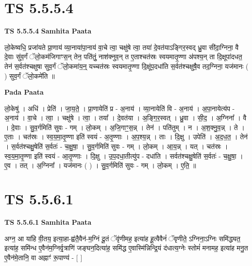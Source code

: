 \documentclass[17pt]{extarticle}
\begin{document}

\section{ TS 5.5.5.4 }

\textbf{TS 5.5.5.4 } \newline
\textbf{Samhita Paata} \newline

लो॒केष्वधि॒ प्रजा॑यते प्रा॒णाय॑ व्या॒नाया॑पा॒नाय॑ वा॒चे त्वा॒ चक्षु॑षे त्वा॒ तया॑ दे॒वत॑याऽङ्गिर॒स्वद् ध्रु॒वा सी॑दा॒ग्निना॒ वै दे॒वाः सु॑व॒र्गं ॅलो॒कम॑जिगाꣳस॒न् तेन॒ पति॑तुं॒ नाश॑क्नुव॒न् त ए॒ताश्चत॑स्रः स्वयमातृ॒ण्णा अ॑पश्य॒न् ता दि॒क्षूपा॑दधत॒ तेन॑ स॒र्वत॑श्चक्षुषा सुव॒र्गं ॅलो॒कमा॑य॒न्॒ यच्चत॑स्रः स्वयमातृ॒ण्णा दि॒क्षू॑प॒दधा॑ति स॒र्वत॑श्चक्षुषै॒व तद॒ग्निना॒ यज॑मानः ( ) सुव॒र्गं ॅलो॒कमे॑ति ॥ \newline

\textbf{Pada Paata} \newline

लो॒केषु॑ । अधि॑ । प्रेति॑ । जा॒य॒ते॒ । प्रा॒णायेति॑ प्र - अ॒नाय॑ । व्या॒नायेति॑ वि - अ॒नाय॑ । अ॒पा॒नायेत्य॑प - अ॒नाय॑ । वा॒चे । त्वा॒ । चक्षु॑षे । त्वा॒ । तया᳚ । दे॒वत॑या । अ॒ङ्गि॒र॒स्वत् । ध्रु॒वा । सी॒द॒ । अ॒ग्निना᳚ । वै । दे॒वाः । सु॒व॒र्गमिति॑ सुवः - गम् । लो॒कम् । अ॒जि॒गाꣳ॒॒स॒न्न् । तेन॑ । पति॑तुम् । न । अ॒श॒क्नु॒व॒न्न् । ते । ए॒ताः । चत॑स्रः । स्व॒य॒मा॒तृ॒ण्णा इति॑ स्वयं - अ॒तृ॒ण्णाः । अ॒प॒श्य॒न्न् । ताः । दि॒क्षु । उपेति॑ । अ॒द॒ध॒त॒ । तेन॑ । स॒र्वत॑श्चक्षु॒षेति॑ स॒र्वतः॑ - च॒क्षु॒षा॒ । सु॒व॒र्गमिति॑ सुवः - गम् । लो॒कम् । आ॒य॒न्न् । यत् । चत॑स्रः । स्व॒य॒मा॒तृ॒ण्णा इति॑ स्वयं - आ॒तृ॒ण्णाः । दि॒क्षु । उ॒प॒दधा॒तीत्यु॑प - दधा॑ति । सर्वत॑श्चक्षु॒षेति॑ स॒र्वतः॑ - च॒क्षु॒षा॒ । ए॒व । तत् । अ॒ग्निना᳚ । यज॑मानः ( ) । सु॒व॒र्गमिति॑ सुवः - गम् । लो॒कम् । ए॒ति॒ ॥  \newline





\section{ TS 5.5.6.1 }

\textbf{TS 5.5.6.1 } \newline
\textbf{Samhita Paata} \newline

अग्न॒ आ या॑हि वी॒तय॒ इत्या॒हा-ह्व॑तै॒वैन॑-म॒ग्निं दू॒तं ॅवृ॑णीमह॒ इत्या॑ह हू॒त्वैवैनं॑ ॅवृणीते॒ ऽग्निना॒ऽग्निः समि॑द्ध्यत॒ इत्या॑ह॒ समि॑न्ध ए॒वैन॑म॒ग्निर्वृ॒त्राणि॑ जङ्घन॒दित्या॑ह॒ समि॑द्ध ए॒वास्मि॑न्निन्द्रि॒यं द॑धात्य॒ग्नेः स्तोमं॑ मनामह॒ इत्या॑ह मनु॒त ए॒वैन॑मे॒तानि॒ वा अह्नाꣳ॑ रू॒पाण्य॑ - [  ] \newline
\end{document}
